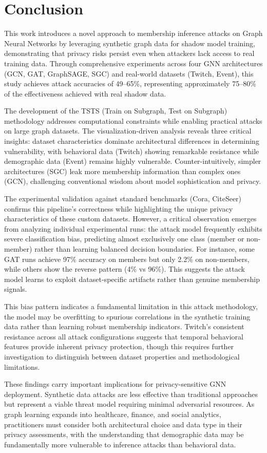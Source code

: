 \documentclass{article}
\begin{document}
\section{Conclusion}
This work introduces a novel approach to membership inference attacks on Graph Neural Networks by leveraging synthetic graph data for shadow model training, demonstrating that privacy risks persist even when attackers lack access to real training data. Through comprehensive experiments across four GNN architectures (GCN, GAT, GraphSAGE, SGC) and real-world datasets (Twitch, Event), this study achieves attack accuracies of 49--65\%, representing approximately 75--80\% of the effectiveness achieved with real shadow data.

The development of the TSTS (Train on Subgraph, Test on Subgraph) methodology addresses computational constraints while enabling practical attacks on large graph datasets. The visualization-driven analysis reveals three critical insights: dataset characteristics dominate architectural differences in determining vulnerability, with behavioral data (Twitch) showing remarkable resistance while demographic data (Event) remains highly vulnerable. Counter-intuitively, simpler architectures (SGC) leak more membership information than complex ones (GCN), challenging conventional wisdom about model sophistication and privacy.

The experimental validation against standard benchmarks (Cora, CiteSeer) confirms this pipeline's correctness while highlighting the unique privacy characteristics of these custom datasets. However, a critical observation emerges from analyzing individual experimental runs: the attack model frequently exhibits severe classification bias, predicting almost exclusively one class (member or non-member) rather than learning balanced decision boundaries. For instance, some GAT runs achieve 97\% accuracy on members but only 2.2\% on non-members, while others show the reverse pattern (4\% vs 96\%). This suggests the attack model learns to exploit dataset-specific artifacts rather than genuine membership signals.

This bias pattern indicates a fundamental limitation in this attack methodology, the model may be overfitting to spurious correlations in the synthetic training data rather than learning robust membership indicators. Twitch's consistent resistance across all attack configurations suggests that temporal behavioral features provide inherent privacy protection, though this requires further investigation to distinguish between dataset properties and methodological limitations.

These findings carry important implications for privacy-sensitive GNN deployment. Synthetic data attacks are less effective than traditional approaches but represent a viable threat model requiring minimal adversarial resources. As graph learning expands into healthcare, finance, and social analytics, practitioners must consider both architectural choice and data type in their privacy assessments, with the understanding that demographic data may be fundamentally more vulnerable to inference attacks than behavioral data.




\end{document}
